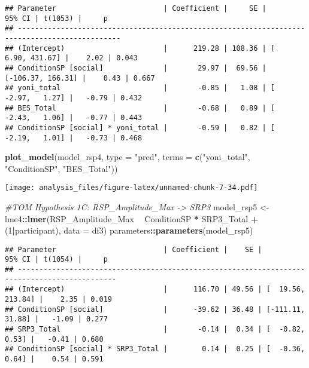 \documentclass[
]{article}
\newenvironment{Shaded}{\begin{snugshade}}{\end{snugshade}}
\newcommand{\CommentTok}[1]{\textcolor[rgb]{0.56,0.35,0.01}{\textit{#1}}}
\newcommand{\DataTypeTok}[1]{\textcolor[rgb]{0.13,0.29,0.53}{#1}}
\newcommand{\DecValTok}[1]{\textcolor[rgb]{0.00,0.00,0.81}{#1}}
\newcommand{\KeywordTok}[1]{\textcolor[rgb]{0.13,0.29,0.53}{\textbf{#1}}}
\newcommand{\NormalTok}[1]{#1}
\newcommand{\OperatorTok}[1]{\textcolor[rgb]{0.81,0.36,0.00}{\textbf{#1}}}
\newcommand{\StringTok}[1]{\textcolor[rgb]{0.31,0.60,0.02}{#1}}
\begin{document}
\begin{verbatim}
## Parameter                         | Coefficient |     SE |            95% CI | t(1053) |     p
## ----------------------------------------------------------------------------------------------
## (Intercept)                       |      219.28 | 108.36 | [   6.90, 431.67] |    2.02 | 0.043
## ConditionSP [social]              |       29.97 |  69.56 | [-106.37, 166.31] |    0.43 | 0.667
## yoni_total                        |       -0.85 |   1.08 | [  -2.97,   1.27] |   -0.79 | 0.432
## BES_Total                         |       -0.68 |   0.89 | [  -2.43,   1.06] |   -0.77 | 0.443
## ConditionSP [social] * yoni_total |       -0.59 |   0.82 | [  -2.19,   1.01] |   -0.73 | 0.468
\end{verbatim}

\begin{Shaded}
\begin{Highlighting}[]
\KeywordTok{plot_model}\NormalTok{(model_rsp4, }\DataTypeTok{type =} \StringTok{"pred"}\NormalTok{, }\DataTypeTok{terms =} \KeywordTok{c}\NormalTok{(}\StringTok{"yoni_total"}\NormalTok{, }\StringTok{"ConditionSP"}\NormalTok{, }\StringTok{"BES_Total"}\NormalTok{))}
\end{Highlighting}
\end{Shaded}

\texttt{[image: analysis\_files/figure-latex/unnamed-chunk-7-34.pdf]}

\begin{Shaded}
\begin{Highlighting}[]
\CommentTok{#TOM Hypothesis 1C: RSP_Amplitude_Max -> SRP3}
\NormalTok{model_rsp5 <-}\StringTok{ }\NormalTok{lme4}\OperatorTok{::}\KeywordTok{lmer}\NormalTok{(RSP_Amplitude_Max }\OperatorTok{~}\StringTok{ }\NormalTok{ConditionSP }\OperatorTok{*}\StringTok{ }\NormalTok{SRP3_Total }\OperatorTok{+}\StringTok{ }\NormalTok{(}\DecValTok{1}\OperatorTok{|}\NormalTok{participant), }\DataTypeTok{data =}\NormalTok{ df3)}
\NormalTok{parameters}\OperatorTok{::}\KeywordTok{parameters}\NormalTok{(model_rsp5)}
\end{Highlighting}
\end{Shaded}

\begin{verbatim}
## Parameter                         | Coefficient |    SE |            95% CI | t(1054) |     p
## ---------------------------------------------------------------------------------------------
## (Intercept)                       |      116.70 | 49.56 | [  19.56, 213.84] |    2.35 | 0.019
## ConditionSP [social]              |      -39.62 | 36.48 | [-111.11,  31.88] |   -1.09 | 0.277
## SRP3_Total                        |       -0.14 |  0.34 | [  -0.82,   0.53] |   -0.41 | 0.680
## ConditionSP [social] * SRP3_Total |        0.14 |  0.25 | [  -0.36,   0.64] |    0.54 | 0.591
\end{verbatim}
\end{document}
